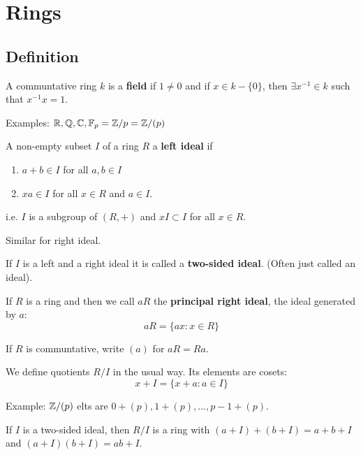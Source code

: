 \chapter{Rings}

\section{Definition}

  \begin{define}
    A communtative ring $k$ is a \textbf{field} if $1 \neq 0$ and if
    $x\in k-\{0\}$, then $\exists x^{-1} \in k$ such that $x^{-1}x=1$.
  \end{define}

  Examples: $\mathbb{R}, \mathbb{Q}, \mathbb{C}, \mathbb{F}_p = \mathbb{Z}/p = \mathbb{Z}/(p)$

  \begin{define}
    A non-empty subset $I$ of a ring $R$ a \textbf{left ideal} if
    \begin{enumerate}
      \item $a+b \in I$ for all $a,b \in I$
      \item $xa \in I$ for all $x \in R$ and $a \in I$.
    \end{enumerate}
  \end{define}

  i.e. $I$ is a subgroup of $(R, +)$ and $xI \subset I$ for all $x \in R$.

  Similar for right ideal.

  \begin{define}
    If $I$ is a left and a right ideal it is called a \textbf{two-sided ideal}.
    (Often just called an ideal).
  \end{define}

  \begin{define}
    If $R$ is a ring and then we call $aR$ the \textbf{principal right ideal}, the
    ideal generated by $a$:
    \[ aR = \{ ax : x \in R\} \]
  \end{define}

  If $R$ is communtative, write $(a)$ for $aR = Ra$.

  \begin{define}
    We define quotients $R/I$ in the usual way. Its elements are cosets:
    \[ x + I = \{ x + a : a \in I \} \]
  \end{define}

  Example: $\mathbb{Z}/(p)$ elts are $0 + (p), 1 + (p), \ldots, p-1 + (p)$.

  \begin{lemma}
    If $I$ is a two-sided ideal, then $R/I$ is a ring with
    $(a+I) + (b+I) = a+b+I$ and $(a+I)(b+I) = ab + I$.
  \end{lemma}

